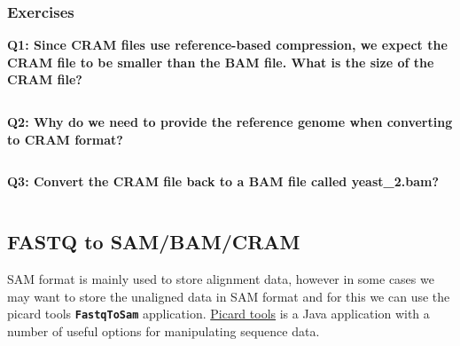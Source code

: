 \documentclass[11pt]{article}
\makeatletter
\newcommand{\boxspacing}{\kern\kvtcb@left@rule\kern\kvtcb@boxsep}
\newcommand{\prompt}[4]{
        {\ttfamily\llap{{\color{blue}\LARGE\faKeyboardO\hspace{3pt}#4}}\vspace{-\baselineskip}}
    }
\makeatother
\begin{document}
    \hypertarget{exercises}{%
\subsubsection{Exercises}\label{exercises}}

\textbf{Q1: Since CRAM files use reference-based compression, we expect
the CRAM file to be smaller than the BAM file. What is the size of the
CRAM file?}

    \begin{tcolorbox}[breakable, size=fbox, boxrule=1pt, pad at break*=1mm,colback=cellbackground, colframe=cellborder]
\prompt{In}{incolor}{ }{\boxspacing}
\begin{Verbatim}[commandchars=\\\{\}]

\end{Verbatim}
\end{tcolorbox}

    \textbf{Q2: Why do we need to provide the reference genome when
converting to CRAM format?}

    \begin{tcolorbox}[breakable, size=fbox, boxrule=1pt, pad at break*=1mm,colback=cellbackground, colframe=cellborder]
\prompt{In}{incolor}{ }{\boxspacing}
\begin{Verbatim}[commandchars=\\\{\}]

\end{Verbatim}
\end{tcolorbox}

    \textbf{Q3: Convert the CRAM file back to a BAM file called
yeast\_2.bam?}

    \begin{tcolorbox}[breakable, size=fbox, boxrule=1pt, pad at break*=1mm,colback=cellbackground, colframe=cellborder]
\prompt{In}{incolor}{ }{\boxspacing}
\begin{Verbatim}[commandchars=\\\{\}]

\end{Verbatim}
\end{tcolorbox}

    \hypertarget{fastq-to-sambamcram}{%
\subsection{FASTQ to SAM/BAM/CRAM}\label{fastq-to-sambamcram}}

SAM format is mainly used to store alignment data, however in some cases
we may want to store the unaligned data in SAM format and for this we
can use the picard tools \textbf{\texttt{FastqToSam}} application.
\href{https://broadinstitute.github.io/picard/}{Picard tools} is a Java
application with a number of useful options for manipulating sequence
data.
\end{document}
